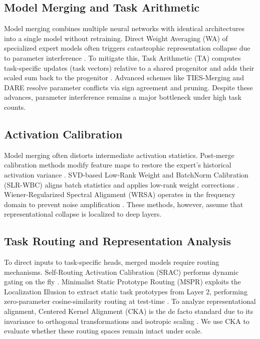 \documentclass{article}
\theoremstyle{plain}
\theoremstyle{definition}
\theoremstyle{remark}
\begin{document}
\subsection{Model Merging and Task Arithmetic}
Model merging combines multiple neural networks with identical architectures into a single model without retraining. Direct Weight Averaging (WA) of specialized expert models \cite{langley00, mitchell80, DudaHart2nd} often triggers catastrophic representation collapse due to parameter interference \cite{Kamboj2023MergingDL}. To mitigate this, Task Arithmetic (TA) computes task-specific updates (task vectors) relative to a shared progenitor and adds their scaled sum back to the progenitor \cite{sharma24}. Advanced schemes like TIES-Merging \cite{Sun2025TaskAI} and DARE \cite{qu24} resolve parameter conflicts via sign agreement and pruning. Despite these advances, parameter interference remains a major bottleneck under high task counts.

\subsection{Activation Calibration}
Model merging often distorts intermediate activation statistics. Post-merge calibration methods modify feature maps to restore the expert's historical activation variance \cite{Zhang2025ControlBF}. SVD-based Low-Rank Weight and BatchNorm Calibration (SLR-WBC) aligns batch statistics and applies low-rank weight corrections \cite{He2024LocalizeandStitchEM}. Wiener-Regularized Spectral Alignment (WRSA) operates in the frequency domain to prevent noise amplification \cite{Yılmaz2025AdvancedAM}. These methods, however, assume that representational collapse is localized to deep layers.

\subsection{Task Routing and Representation Analysis}
To direct inputs to task-specific heads, merged models require routing mechanisms. Self-Routing Activation Calibration (SRAC) performs dynamic gating on the fly \cite{selfrouting26}. Minimalist Static Prototype Routing (MSPR) exploits the Localization Illusion to extract static task prototypes from Layer 2, performing zero-parameter cosine-similarity routing at test-time \cite{furina25}. To analyze representational alignment, Centered Kernel Alignment (CKA) is the de facto standard due to its invariance to orthogonal transformations and isotropic scaling \cite{Ding2021GroundingRS}. We use CKA to evaluate whether these routing spaces remain intact under scale.
\end{document}
